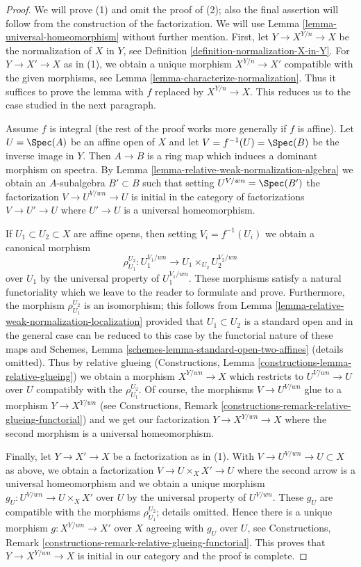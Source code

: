 \begin{proof}
We will prove (1) and omit the proof of (2); also the final assertion
will follow from the construction of the factorization. We will use
Lemma \ref{lemma-universal-homeomorphism} without
further mention. First, let $Y \to X^{Y/n} \to X$ be the normalization
of $X$ in $Y$, see Definition \ref{definition-normalization-X-in-Y}.
For $Y \to X' \to X$ as in (1), we obtain a unique morphism
$X^{Y/n} \to X'$ compatible with the given morphisms, see
Lemma \ref{lemma-characterize-normalization}. Thus it suffices
to prove the lemma with $f$ replaced by $X^{Y/n} \to X$. This reduces
us to the case studied in the next paragraph.

\medskip\noindent
Assume $f$ is integral (the rest of the proof works more generally if
$f$ is affine). Let $U = \Spec(A)$ be an affine open of $X$ and let
$V = f^{-1}(U) = \Spec(B)$ be the inverse image in $Y$.
Then $A \to B$ is a ring map which induces a dominant morphism
on spectra. By Lemma \ref{lemma-relative-weak-normalization-algebra}
we obtain an $A$-subalgebra $B' \subset B$ such that setting
$U^{V/wn} = \Spec(B')$ the factorization $V \to U^{V/wn} \to U$
is initial in the category of factorizations $V \to U' \to U$ where
$U' \to U$ is a universal homeomorphism.

\medskip\noindent
If $U_1 \subset U_2 \subset X$ are affine opens, then setting
$V_i = f^{-1}(U_i)$ we obtain a canonical morphism
$$
\rho_{U_1}^{U_2} : U_1^{V_1/wn} \to U_1 \times_{U_2} U_2^{V_2/wn}
$$
over $U_1$ by the universal property of $U_1^{V_1/wn}$. These morphisms satisfy
a natural functoriality which we leave to the reader to formulate and prove.
Furthermore, the morphism $\rho_{U_1}^{U_2}$
is an isomorphism; this follows from
Lemma \ref{lemma-relative-weak-normalization-localization}
provided that $U_1 \subset U_2$ is a standard open
and in the general case can be reduced to this case
by the functorial nature of these maps and
Schemes, Lemma \ref{schemes-lemma-standard-open-two-affines}
(details omitted). Thus by relative glueing
(Constructions, Lemma \ref{constructions-lemma-relative-glueing})
we obtain a morphism $X^{Y/wn} \to X$ which restricts
to $U^{V/wn} \to U$ over $U$ compatibly with the $\rho_{U_1}^{U_2}$.
Of course, the morphisms $V \to U^{V/wn}$ glue to a morphism $Y \to X^{Y/wn}$
(see Constructions, Remark
\ref{constructions-remark-relative-glueing-functorial})
and we get our factorization $Y \to X^{Y/wn} \to X$ where the second morphism
is a universal homeomorphism.

\medskip\noindent
Finally, let $Y \to X' \to X$ be a factorization as in (1).
With $V \to U^{V/wn} \to U \subset X$ as above,
we obtain a factorization $V \to U \times_X X' \to U$ where
the second arrow is a universal homeomorphism
and we obtain a unique morphism $g_U : U^{V/wn} \to U \times_X X'$ over $U$
by the universal property of $U^{V/wn}$.
These $g_U$ are compatible with the morphisms $\rho_{U_1}^{U_2}$; details
omitted. Hence there is a unique morphism $g : X^{Y/wn} \to X'$
over $X$ agreeing with $g_U$ over $U$, see
Constructions, Remark \ref{constructions-remark-relative-glueing-functorial}.
This proves that $Y \to X^{Y/wn} \to X$ is initial in our category
and the proof is complete.
\end{proof}

